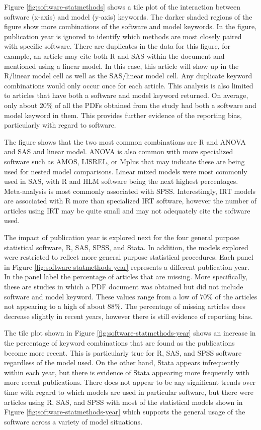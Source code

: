 \documentclass[
  english,
  ,man]{apa6}
\begin{document}
Figure \ref{fig:software-statmethods} shows a tile plot of the interaction between software (x-axis) and model (y-axis) keywords. The darker shaded regions of the figure show more combinations of the software and model keywords. In the figure, publication year is ignored to identify which methods are most closely paired with specific software. There are duplicates in the data for this figure, for example, an article may cite both R and SAS within the document and mentioned using a linear model. In this case, this article will show up in the R/linear model cell as well as the SAS/linear model cell. Any duplicate keyword combinations would only occur once for each article. This analysis is also limited to articles that have both a software and model keyword returned. On average, only about 20\% of all the PDFs obtained from the study had both a software and model keyword in them. This provides further evidence of the reporting bias, particularly with regard to software.

The figure shows that the two most common combinations are R and ANOVA and SAS and linear model. ANOVA is also common with more specialized software such as AMOS, LISREL, or Mplus that may indicate these are being used for nested model comparisons. Linear mixed models were most commonly used in SAS, with R and HLM software being the next highest percentages. Meta-analysis is most commonly associated with SPSS. Interestingly, IRT models are associated with R more than specialized IRT software, however the number of articles using IRT may be quite small and may not adequately cite the software used.

The impact of publication year is explored next for the four general purpose statistical software, R, SAS, SPSS, and Stata. In addition, the models explored were restricted to reflect more general purpose statistical procedures. Each panel in Figure \ref{fig:software-statmethods-year} represents a different publication year. In the panel label the percentage of articles that are missing. More specifically, these are studies in which a PDF document was obtained but did not include software and model keyword. These values range from a low of 70\% of the articles not appearing to a high of about 88\%. The percentage of missing articles does decrease slightly in recent years, however there is still evidence of reporting bias.

The tile plot shown in Figure \ref{fig:software-statmethods-year} shows an increase in the percentage of keyword combinations that are found as the publications become more recent. This is particularly true for R, SAS, and SPSS software regardless of the model used. On the other hand, Stata appears infrequently within each year, but there is evidence of Stata appearing more frequently with more recent publications. There does not appear to be any significant trends over time with regard to which models are used in particular software, but there were articles using R, SAS, and SPSS with most of the statistical models shown in Figure \ref{fig:software-statmethods-year} which supports the general usage of the software across a variety of model situations.
\end{document}
